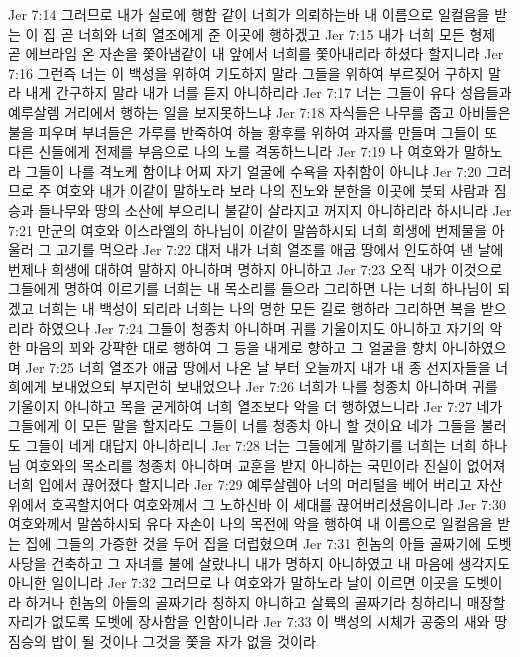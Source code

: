 Jer 7:14  그러므로 내가 실로에 행함 같이 너희가 의뢰하는바 내 이름으로 일컬음을 받는 이 집 곧 너희와 너희 열조에게 준 이곳에 행하겠고
Jer 7:15  내가 너희 모든 형제 곧 에브라임 온 자손을 쫓아냄같이 내 앞에서 너희를 쫓아내리라 하셨다 할지니라
Jer 7:16  그런즉 너는 이 백성을 위하여 기도하지 말라 그들을 위하여 부르짖어 구하지 말라 내게 간구하지 말라 내가 너를 듣지 아니하리라
Jer 7:17  너는 그들이 유다 성읍들과 예루살렘 거리에서 행하는 일을 보지못하느냐
Jer 7:18  자식들은 나무를 줍고 아비들은 불을 피우며 부녀들은 가루를 반죽하여 하늘 황후를 위하여 과자를 만들며 그들이 또 다른 신들에게 전제를 부음으로 나의 노를 격동하느니라
Jer 7:19  나 여호와가 말하노라 그들이 나를 격노케 함이냐 어찌 자기 얼굴에 수욕을 자취함이 아니냐
Jer 7:20  그러므로 주 여호와 내가 이같이 말하노라 보라 나의 진노와 분한을 이곳에 붓되 사람과 짐승과 들나무와 땅의 소산에 부으리니 불같이 살라지고 꺼지지 아니하리라 하시니라
Jer 7:21  만군의 여호와 이스라엘의 하나님이 이같이 말씀하시되 너희 희생에 번제물을 아울러 그 고기를 먹으라
Jer 7:22  대저 내가 너희 열조를 애굽 땅에서 인도하여 낸 날에 번제나 희생에 대하여 말하지 아니하며 명하지 아니하고
Jer 7:23  오직 내가 이것으로 그들에게 명하여 이르기를 너희는 내 목소리를 들으라 그리하면 나는 너희 하나님이 되겠고 너희는 내 백성이 되리라 너희는 나의 명한 모든 길로 행하라 그리하면 복을 받으리라 하였으나
Jer 7:24  그들이 청종치 아니하며 귀를 기울이지도 아니하고 자기의 악한 마음의 꾀와 강퍅한 대로 행하여 그 등을 내게로 향하고 그 얼굴을 향치 아니하였으며
Jer 7:25  너희 열조가 애굽 땅에서 나온 날 부터 오늘까지 내가 내 종 선지자들을 너희에게 보내었으되 부지런히 보내었으나
Jer 7:26  너희가 나를 청종치 아니하며 귀를 기울이지 아니하고 목을 굳게하여 너희 열조보다 악을 더 행하였느니라
Jer 7:27  네가 그들에게 이 모든 말을 할지라도 그들이 너를 청종치 아니 할 것이요 네가 그들을 불러도 그들이 네게 대답지 아니하리니
Jer 7:28  너는 그들에게 말하기를 너희는 너희 하나님 여호와의 목소리를 청종치 아니하며 교훈을 받지 아니하는 국민이라 진실이 없어져 너희 입에서 끊어졌다 할지니라
Jer 7:29  예루살렘아 너의 머리털을 베어 버리고 자산 위에서 호곡할지어다 여호와께서 그 노하신바 이 세대를 끊어버리셨음이니라
Jer 7:30  여호와께서 말씀하시되 유다 자손이 나의 목전에 악을 행하여 내 이름으로 일컬음을 받는 집에 그들의 가증한 것을 두어 집을 더럽혔으며
Jer 7:31  힌놈의 아들 골짜기에 도벳 사당을 건축하고 그 자녀를 불에 살랐나니 내가 명하지 아니하였고 내 마음에 생각지도 아니한 일이니라
Jer 7:32  그러므로 나 여호와가 말하노라 날이 이르면 이곳을 도벳이라 하거나 힌놈의 아들의 골짜기라 칭하지 아니하고 살륙의 골짜기라 칭하리니 매장할 자리가 없도록 도벳에 장사함을 인함이니라
Jer 7:33  이 백성의 시체가 공중의 새와 땅 짐승의 밥이 될 것이나 그것을 쫓을 자가 없을 것이라
